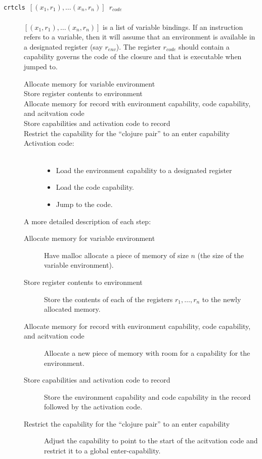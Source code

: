 \documentclass[a4paper]{article}
\newcommand{\forcenewline}{$\phantom{v}$\\}
\newcommand{\var}[1]{\mathit{#1}}
\begin{document}
\begin{description}
\item[\texttt{crtcls $[(x_1,r_1),\dots(x_n,r_n)]$ $r_{\var{code}}$}] \forcenewline
  $[(x_1,r_1),\dots(x_n,r_n)]$ is a list of variable bindings. If an instruction refers to a variable, then it will assume that an environment is available in a designated register (say $r_{\var{env}}$). The register $r_{\var{code}}$ should contain a capability governs the code of the closure and that is executable when jumped to.
  \begin{description}
  \item[Allocate memory for variable environment]
  \item[Store register contents to environment]
  \item[Allocate memory for record with environment capability, code capability, and acitvation code]
  \item[Store capabilities and activation code to record]
  \item[Restrict the capability for the ``clojure pair'' to an enter capability]
  \item[Activation code:] \forcenewline
    \begin{itemize}
    \item Load the environment capability to a designated register
    \item Load the code capability.
    \item Jump to the code.
    \end{itemize}
  \end{description}
  A more detailed description of each step:
  \begin{description}
  \item[Allocate memory for variable environment] Have malloc allocate a piece of memory of size $n$ (the size of the variable environment). 
  \item[Store register contents to environment] Store the contents of each of the registers $r_1,\dots,r_n$ to the newly allocated memory.
  \item[Allocate memory for record with environment capability, code capability, and acitvation code] Allocate a new piece of memory with room for a capability for the environment.
  \item[Store capabilities and activation code to record] Store the environment capability and code capability in the record followed by the activation code. 
  \item[Restrict the capability for the ``clojure pair'' to an enter capability] Adjust the capability to point to the start of the acitvation code and restrict it to a global enter-capability.

\end{description}
\end{description}
\end{document}
